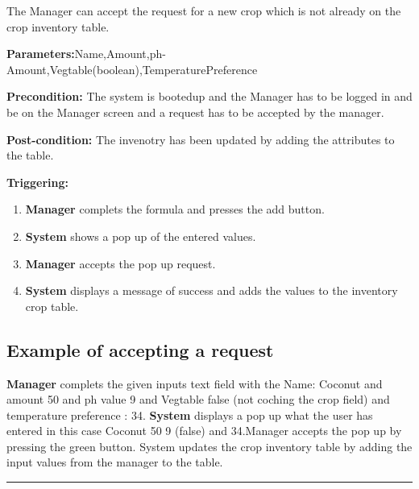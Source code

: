The Manager can accept the request for a new crop which is not already on the
crop inventory table.
\begin{description}
\item
\textbf{Parameters:}Name,Amount,ph-Amount,Vegtable(boolean),TemperaturePreference
\item \textbf{Precondition:} The system is bootedup and the Manager has to be
logged in and be on the Manager screen and a request has to be accepted by the
manager.
\item \textbf{Post-condition:} The invenotry has been updated by adding the
attributes to the table.
\item \textbf{Triggering:}
\begin{enumerate}
\item \textbf{Manager} complets the formula and presses the add button.
\item \textbf{System} shows a pop up of the entered values.
\item \textbf{Manager} accepts the pop up request.
\item \textbf{System} displays a message of success and adds the values to the
inventory crop table.

\end{enumerate}
\end{description}

\subsection{Example of accepting a request}
\textbf{Manager} complets the given inputs text field with the
Name: Coconut and amount 50 and ph value 9 and Vegtable false
(not coching the crop field) and temperature preference : 34. \textbf{System}
displays a pop up  what the user has entered in this case Coconut 50 9 (false)
and 34.Manager accepts the pop up by pressing the green button. System updates
the crop inventory table by adding the input values from the manager to the
table.
\hfill
\vspace{0.5cm}
\hrule






















\break

